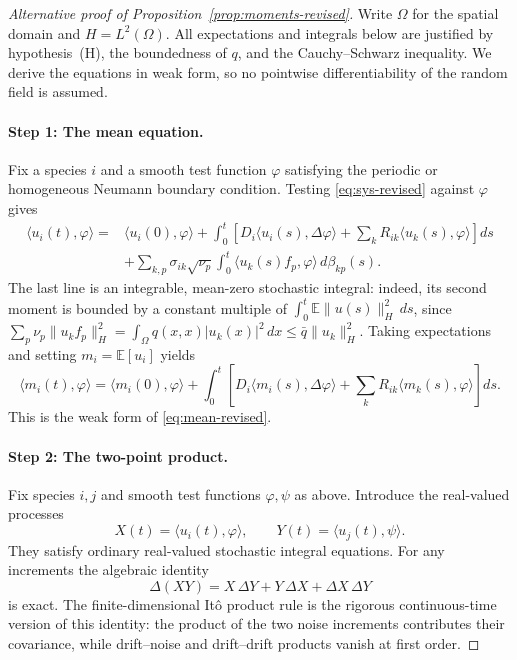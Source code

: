 \begin{proof}[Alternative proof of Proposition~\ref{prop:moments-revised}]
Write $\Omega$ for the spatial domain and $H=L^2(\Omega)$.
All expectations and integrals below are justified by hypothesis~(H),
the boundedness of $q$, and the Cauchy--Schwarz inequality.
We derive the equations in weak form, so no pointwise differentiability
of the random field is assumed.

\paragraph{Step 1: The mean equation.}
Fix a species $i$ and a smooth test function $\varphi$ satisfying the
periodic or homogeneous Neumann boundary condition. Testing \eqref{eq:sys-revised}
against $\varphi$ gives
\begin{align*}
\langle u_i(t),\varphi\rangle
={}&\langle u_i(0),\varphi\rangle
 +\int_0^t\left[D_i\langle u_i(s),\Delta\varphi\rangle
       +\sum_kR_{ik}\langle u_k(s),\varphi\rangle\right]ds\\
&+\sum_{k,p}\sigma_{ik}\sqrt{\nu_p}
   \int_0^t\langle u_k(s)f_p,\varphi\rangle\,d\beta_{kp}(s).
\end{align*}
The last line is an integrable, mean-zero stochastic integral:
indeed, its second moment is bounded by a constant multiple of
$\int_0^t\mathbb E\|u(s)\|_H^2\,ds$, since
$\sum_p\nu_p\|u_k f_p\|_H^2
=\int_{\Omega}q(x,x)|u_k(x)|^2\,dx
\leq\bar q\|u_k\|_H^2$.
Taking expectations and setting $m_i=\mathbb E[u_i]$ yields
\[
\langle m_i(t),\varphi\rangle
=\langle m_i(0),\varphi\rangle
 +\int_0^t\left[D_i\langle m_i(s),\Delta\varphi\rangle
       +\sum_kR_{ik}\langle m_k(s),\varphi\rangle\right]ds.
\]
This is the weak form of \eqref{eq:mean-revised}.

\paragraph{Step 2: The two-point product.}
Fix species $i,j$ and smooth test functions $\varphi,\psi$ as above.
Introduce the real-valued processes
\[
X(t)=\langle u_i(t),\varphi\rangle,
\qquad Y(t)=\langle u_j(t),\psi\rangle.
\]
They satisfy ordinary real-valued stochastic integral equations.
For any increments the algebraic identity
\[
\Delta(XY)=X\,\Delta Y+Y\,\Delta X+\Delta X\,\Delta Y
\]
is exact. The finite-dimensional It\^o product rule is the rigorous
continuous-time version of this identity: the product of the two
noise increments contributes their covariance, while drift--noise
and drift--drift products vanish at first order.


\end{proof}
